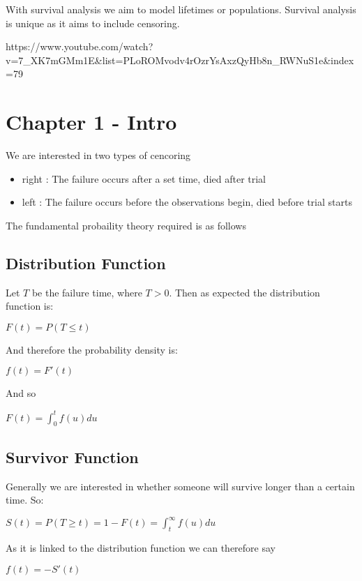 \documentclass[
  letterpaper,
  DIV=11,
  numbers=noendperiod]{scrreprt}
\providecommand{\tightlist}{%
  \setlength{\itemsep}{0pt}\setlength{\parskip}{0pt}}\usepackage{longtable,booktabs,array}
\begin{document}
With survival analysis we aim to model lifetimes or populations.
Survival analysis is unique as it aims to include censoring.

https://www.youtube.com/watch?v=7\_XK7mGMm1E\&list=PLoROMvodv4rOzrYsAxzQyHb8n\_RWNuS1e\&index=79

\hypertarget{chapter-1---intro-1}{%
\section{Chapter 1 - Intro}\label{chapter-1---intro-1}}

We are interested in two types of cencoring

\begin{itemize}
\tightlist
\item
  right : The failure occurs after a set time, died after trial
\item
  left : The failure occurs before the observations begin, died before
  trial starts
\end{itemize}

The fundamental probaility theory required is as follows

\hypertarget{distribution-function}{%
\subsection{Distribution Function}\label{distribution-function}}

Let \(T\) be the failure time, where \(T>0\). Then as expected the
distribution function is:

\(F(t) = P(T\leq t)\)

And therefore the probability density is:

\(f(t) = F'(t)\)

And so

\(F(t) = \int_0^tf(u)du\)

\hypertarget{survivor-function}{%
\subsection{Survivor Function}\label{survivor-function}}

Generally we are interested in whether someone will survive longer than
a certain time. So:

\(S(t) = P(T\geq t) = 1 - F(t) = \int^{\infty}_t f(u) du\)

As it is linked to the distribution function we can therefore say

\(f(t) = -S'(t)\)
\end{document}
